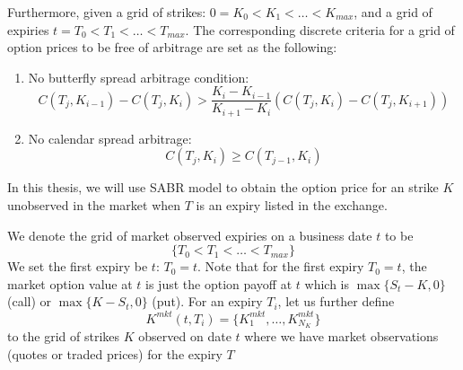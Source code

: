 \documentclass[letterpaper,12pt,titlepage,oneside,final]{book}
\numberwithin{equation}{section}
\theoremstyle{definition}
\begin{document}
\begin{enumerate}

\end{enumerate}

Furthermore,  given a  grid of strikes: $0=K_0<K_1<\dots<K_{max}$, and a grid of expiries $t=T_0 < T_1 < \dots< T_{max} $.   The corresponding discrete criteria \cite{carr2005note} for a grid of  option prices to be free of arbitrage are set as the following: 
\begin{enumerate}
	\item  No butterfly spread arbitrage condition:
	 \begin{equation}
	C(T_{j},K_{i-1})-C(T_{j},K_{i}) > \frac{K_i-K_{i-1}}{K_{i+1}-K_{i}}
	\left( C(T_{j},K_{i})-C(T_{j},K_{i+1})  \right)
	\label{eq:DiscreteCond1}
\end{equation}
	\item  No calendar spread arbitrage:
	\begin{equation}
	C(T_{j},K_{i})\geq C(T_{j-1},K_{i})
	\label{eq:DiscreteCond2}
\end{equation}

\end{enumerate}



In this thesis, we will use SABR model to obtain the option price for an strike $K$ unobserved in the market when $T$ is an expiry listed in the exchange.


We denote the grid of market observed expiries on a business date $t$ to be \[
\{ T_{0}<
T_1 < \dots< T_{max}
\}
\]
We set the first expiry be $t$: $T_{0}=t$. Note that for the first expiry $T_{0}=t$, the market option value at $t$ is just the option payoff at $t$ which is $\max\{S_t-K,0\}$ (call) or  $\max\{K-S_t,0\}$ (put).  For an  expiry $T_i$, let us further define 
\[K^{mkt}(t,T_i)=
\{
	K^{mkt}_{1},\dots,K^{mkt}_{N_K}
\}
\] to the grid of strikes $K$ observed on date $t$  where we have market observations (quotes or traded prices) for the expiry $T$
\end{document}

